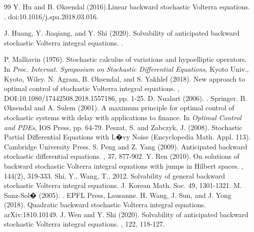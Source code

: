 \documentclass[12pt]{article}
\theoremstyle{remark}
\numberwithin{equation}{section}
\begin{document}
\begin{thebibliography}{99}
 Y. Hu and B. {\O}ksendal (2016).\newblock Linear backward stochastic Volterra equations. . doi:10.1016/j.spa.2018.03.016.

 J. Huang, Y. Jiaqiang, and Y. Shi (2020).
\newblock Solvability of anticipated backward stochastic Volterra integral equations. .

P. Malliavin (1976).
\newblock Stochastic calculus of variations and hypoelliptic operators.
\newblock In {\em Proc. Internat. Symposium on Stochastic Differential Equations}, Kyoto Univ., Kyoto, Wiley.
N. Agram, B. {\O}ksendal, and S. Yakhlef (2018).
\newblock New approach to optimal control of stochastic Volterra integral equations.
, DOI:10.1080/17442508.2018.1557186, pp. 1-25.
D. Nualart (2006).
.
\newblock Springer.
B. {\O}ksendal and A. Sulem (2001).
\newblock A maximum principle for optimal control of stochastic systems with delay with applications to finance.
\newblock In {\em Optimal Control and PDEs}, IOS Press, pp. 64-79.
Peszat, S. and Zabczyk, J. (2008). \newblock Stochastic Partial Differential Equations with L�vy Noise (Encyclopedia
Math. Appl. 113). Cambridge University Press.
S. Peng and Z. Yang (2009).
\newblock Anticipated backward stochastic differential equations.
, 37, 877-902.
Y. Ren (2010).
\newblock On solutions of backward stochastic Volterra integral equations with jumps in Hilbert spaces.
, 144(2), 319-333.
Shi, Y., Wang, T., 2012. Solvability of general backward stochastic Volterra integral equations. J. Korean Math. Soc. 49, 1301-1321.
M. Sanz-Sol� (2005).
.
\newblock EPFL Press, Lausanne.
H. Wang, J. Sun, and J. Yong (2018).
\newblock Quadratic backward stochastic Volterra integral equations.
\newblock arXiv:1810.10149.
J. Wen and Y. Shi (2020).
\newblock Solvability of anticipated backward stochastic Volterra integral equations.
, 122, 118-127.

\end{thebibliography}
\end{document}
